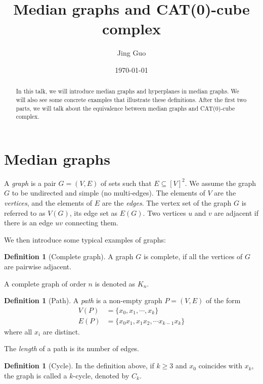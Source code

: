 \documentclass[12pt, a4paper]{article}
\title{Median graphs and CAT(0)-cube complex}
\author{Jing Guo}
\date{\today}
\theoremstyle{plain}
\theoremstyle{definition}
\newtheorem{definition}[theorem]{Definition}
\theoremstyle{remark}
\begin{document}
    \maketitle
    
    \begin{abstract}
        In this talk, we will introduce median graphs and hyperplanes in median graphs. We will also see some concrete examples that illustrate these definitions. After the first two parts, we will talk about the equivalence between median graphs and CAT(0)-cube complex.
    \end{abstract}
    
    \tableofcontents
    
    \section{Median graphs}
    
    A \textit{graph} is a pair $G = (V, E)$ of sets such that $E \subseteq [V]^{2}$. We assume the graph $G$ to be undirected and simple (no multi-edges). The elements of $V$ are the \textit{vertices}, and the elements of $E$ are the \textit{edges}. The vertex set of the graph $G$ is referred to as $V(G)$, its edge set as $E(G)$. Two vertices $u$ and $v$ are adjacent if there is an edge $uv$ connecting them.
    
    We then introduce some typical examples of graphs:
    
    \begin{definition}[Complete graph]
        A graph $G$ is complete, if all the vertices of $G$ are pairwise adjacent.
        
        A complete graph of order $n$ is denoted as $K_{n}$. 
    \end{definition}
    
    \begin{definition}[Path]
        A \textit{path} is a non-empty graph $P = (V, E)$ of the form
        \begin{align*}
            V(P) &= \{ x_{0}, x_{1}, \cdots, x_{k} \} \\
            E(P) &= \{ x_{0} x_{1}, x_{1} x_{2}, \cdots x_{k-1} x_{k} \}
        \end{align*}
        where all $x_{i}$ are distinct.
        
        The \textit{length} of a path is its number of edges.
    \end{definition}
    
    \begin{definition}[Cycle]
        In the definition above, if $k \geq 3$ and $x_{0}$ coincides with $x_{k}$, the graph is called a $k$-cycle, denoted by $C_{k}$.
    \end{definition}
    
\end{document}
